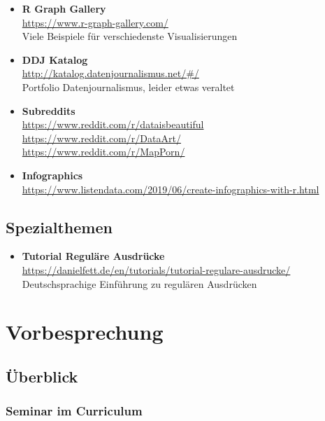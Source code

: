 \documentclass[11pt,german,a4paper]{article}
\providecommand{\tightlist}{%
  \setlength{\itemsep}{0pt}\setlength{\parskip}{0pt}}
\begin{document}
\begin{itemize}
\item
  \textbf{R Graph Gallery}\\
  \url{https://www.r-graph-gallery.com/}~\\
  Viele Beispiele für verschiedenste Visualisierungen
\item
  \textbf{DDJ Katalog}\\
  \url{http://katalog.datenjournalismus.net/\#/}~\\
  Portfolio Datenjournalismus, leider etwas veraltet
\item
  \textbf{Subreddits}\\
  \url{https://www.reddit.com/r/dataisbeautiful}~\\
  \url{https://www.reddit.com/r/DataArt/}~\\
  \url{https://www.reddit.com/r/MapPorn/}
\item
  \textbf{Infographics}\\
  \url{https://www.listendata.com/2019/06/create-infographics-with-r.html}
\end{itemize}

\hypertarget{spezialthemen}{%
\subsection*{Spezialthemen}\label{spezialthemen}}

\begin{itemize}
\tightlist
\item
  \textbf{Tutorial Reguläre Ausdrücke}\\
  \url{https://danielfett.de/en/tutorials/tutorial-regulare-ausdrucke/}~\\
  Deutschsprachige Einführung zu regulären Ausdrücken
\end{itemize}

\hypertarget{vorbesprechung}{%
\section{Vorbesprechung}\label{vorbesprechung}}

\hypertarget{uxfcberblick}{%
\subsection{Überblick}\label{uxfcberblick}}

\hypertarget{seminar-im-curriculum}{%
\subsubsection{Seminar im Curriculum}\label{seminar-im-curriculum}}
\end{document}
